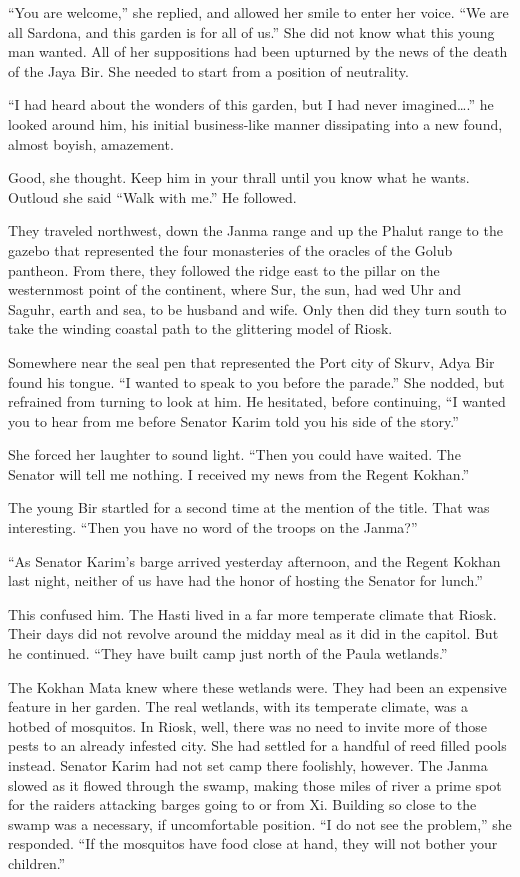 \documentclass{article}
\begin{document}
	“You are welcome,” she replied, and allowed her smile to enter her voice. “We are all Sardona, and this garden is for all of us.” She did not know what this young man wanted. All of her suppositions had been upturned by the news of the death of the Jaya Bir. She needed to start from a position of neutrality.
	
	“I had heard about the wonders of this garden, but I had never imagined….” he looked around him, his initial business-like manner dissipating into a new found, almost boyish, amazement.
	
	Good, she thought. Keep him in your thrall until you know what he wants. Outloud she said “Walk with me.” He followed.
	
	They traveled northwest, down the Janma range and up the Phalut range to the gazebo that represented the four monasteries of the oracles of the Golub pantheon. From there, they followed the ridge east to the pillar on the westernmost point of the continent, where Sur, the sun, had wed Uhr and Saguhr, earth and sea, to be husband and wife. Only then did they turn south to take the winding coastal path to the glittering model of Riosk.
	
	Somewhere near the seal pen that represented the Port city of Skurv, Adya Bir found his tongue. “I wanted to speak to you before the parade.” She nodded, but refrained from turning to look at him. He hesitated, before continuing, “I wanted you to hear from me before Senator Karim told you his side of the story.” 
	
	She forced her laughter to sound light. “Then you could have waited. The Senator will tell me nothing. I received my news from the Regent Kokhan.” 
	
	The young Bir startled for a second time at the mention of the title. That was interesting. “Then you have no word of the troops on the Janma?”
	
	“As Senator Karim’s barge arrived yesterday afternoon, and the Regent Kokhan last night, neither of us have had the honor of hosting the Senator for lunch.”
	
	This confused him. The Hasti lived in a far more temperate climate that Riosk. Their days did not revolve around the midday meal as it did in the capitol. But he continued. “They have built camp just north of the Paula wetlands.” 
	
	The Kokhan Mata knew where these wetlands were. They had been an expensive feature in her garden. The real wetlands, with its temperate climate, was a hotbed of mosquitos. In Riosk, well, there was no need to invite more of those pests to an already infested city. She had settled for a handful of reed filled pools instead. Senator Karim had not set camp there foolishly, however. The Janma slowed as it flowed through the swamp, making those miles of river a prime spot for the raiders attacking barges going to or from Xi. Building so close to the swamp was a necessary, if uncomfortable position. “I do not see the problem,” she responded. “If the mosquitos have food close at hand, they will not bother your children.”
	
\end{document}
